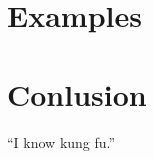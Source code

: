 \documentclass[adraft, copyright,creativecommons,sharealike,noncommercial]{Preambles/eptcs}
\begin{document}
\section{Examples}

\section{Conlusion}

``I know kung fu.''	
\end{document}
